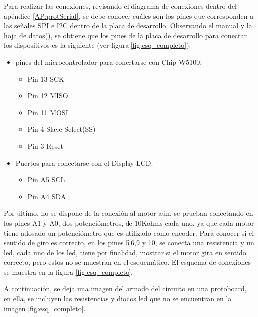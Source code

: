   
Para realizar las conexiones, revisando el diagrama de conexiones dentro del apéndice \ref{AP:protSerial}, se debe conocer cuáles son los pines que corresponden a las señales SPI e I2C dentro de la placa de desarrollo. Observando el manual y la hoja de datos(\cite{arduno}), se obtiene que los pines de la placa de desarrollo para conectar los dispositivos es la siguiente (ver figura \ref{fig:esq_completo}): 
\begin{itemize}
	\item pines del microcontrolador para conectarse con Chip  W5100:  
	\begin{itemize}
		\item Pin 13  SCK 
		\item Pin 12  MISO 
		\item Pin 11  MOSI 
		\item Pin 4   Slave Select(SS)
		\item Pin 3   Reset 	
	\end{itemize}
	\item Puertos para conectarse con el Display LCD:    
	\begin{itemize} 
		\item Pin A5  SCL
		\item Pin A4  SDA
	\end{itemize}  
\end{itemize}  

Por último, no se dispone de la conexión al motor aún, se prueban conectando en los pines A1 y A0, dos potenciómetros, de 10Kohms cada uno, ya que cada motor tiene adosado un potenciómetro que es utilizado como encoder. Para conocer si el sentido de giro es correcto, en los pines 5,6,9 y 10, se conecta una resistencia y un led, cada uno de los led, tiene por finalidad, mostrar si el motor gira en sentido correcto, pero estos no se muestran en el esquemático. El esquema de conexiones se muestra en la figura \ref{fig:esq_completo}.  

A continuación, se deja una imagen del armado del circuito en una protoboard, en ella, se incluyen las resistencias y diodos led que no se encuentran en la imagen \ref{fig:esq_completo}. 




